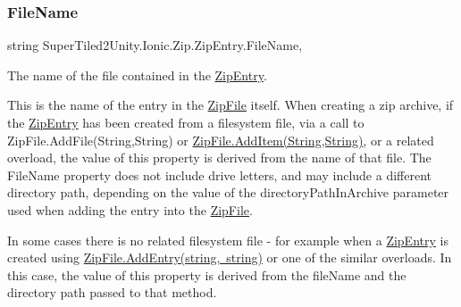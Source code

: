  \mbox{\label{class_super_tiled2_unity_1_1_ionic_1_1_zip_1_1_zip_entry_a78e0c5ee8272a51926eabb9ffc1b38d9}} 
\subsubsection{\texorpdfstring{File\+Name}{FileName}}
{\footnotesize\ttfamily string Super\+Tiled2\+Unity.\+Ionic.\+Zip.\+Zip\+Entry.\+File\+Name\hspace{0.3cm}{\ttfamily [get]}, {\ttfamily [set]}}



The name of the file contained in the \mbox{\hyperlink{class_super_tiled2_unity_1_1_ionic_1_1_zip_1_1_zip_entry}{Zip\+Entry}}. 

This is the name of the entry in the {\ttfamily \mbox{\hyperlink{class_super_tiled2_unity_1_1_ionic_1_1_zip_1_1_zip_file}{Zip\+File}}} itself. When creating a zip archive, if the {\ttfamily \mbox{\hyperlink{class_super_tiled2_unity_1_1_ionic_1_1_zip_1_1_zip_entry}{Zip\+Entry}}} has been created from a filesystem file, via a call to Zip\+File.\+Add\+File(\+String,\+String) or \mbox{\hyperlink{class_super_tiled2_unity_1_1_ionic_1_1_zip_1_1_zip_file_a4f5b34dc261ef4f4af63d0a692d9cfc6}{Zip\+File.\+Add\+Item(\+String,\+String)}}, or a related overload, the value of this property is derived from the name of that file. The {\ttfamily File\+Name} property does not include drive letters, and may include a different directory path, depending on the value of the {\ttfamily directory\+Path\+In\+Archive} parameter used when adding the entry into the {\ttfamily \mbox{\hyperlink{class_super_tiled2_unity_1_1_ionic_1_1_zip_1_1_zip_file}{Zip\+File}}}. 

In some cases there is no related filesystem file -\/ for example when a {\ttfamily \mbox{\hyperlink{class_super_tiled2_unity_1_1_ionic_1_1_zip_1_1_zip_entry}{Zip\+Entry}}} is created using \mbox{\hyperlink{class_super_tiled2_unity_1_1_ionic_1_1_zip_1_1_zip_file_a7f8d10ab9f75f0de6d27a61e5466c210}{Zip\+File.\+Add\+Entry(string,
  string)}} or one of the similar overloads. In this case, the value of this property is derived from the file\+Name and the directory path passed to that method. 

